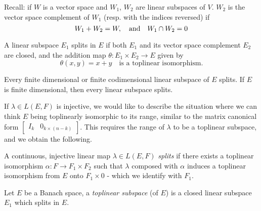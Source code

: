 \documentclass[../main-manifolds.tex]{subfiles}
\begin{document}


Recall: if $W$ is a vector space and $W_1$, $W_2$ are linear subspaces of $V$. $W_2$ is the vector space complement of $W_1$ (resp. with the indices reversed) if 
\[W_1 + W_2 = W,\qqtext{and} W_1\cap W_2 = 0\]
\begin{definition}[Splitting in $E$]\label{def:splitting-subspace}
A linear subspace $E_1$ splits in $E$ if both $E_1$ and its vector space complement $E_2$ are closed, and the addition map $\theta: E_1\times E_2\to E$ given by 
\[
    \theta(x,y)= x + y\quad\text{is a toplinear isomorphism.}
\]
\end{definition}
\begin{remark}
Every finite dimensional or finite codimensional linear subspace of $E$ splits. If $E$ is finite dimensional, then every linear subspace splits.    
\end{remark}
%
%
If $\lambda\in L(E,F)$ is injective, we would like to describe the situation where we can think $E$ being toplinearly isomorphic to its range, similar to the matrix canonical form $\begin{bmatrix}I_{k} & 0_{k\times (n-k)} \end{bmatrix}$. This requires the range of $\lambda$ to be a toplinear subspace, and we obtain the following.
%
\begin{definition}[Splitting in $L(E,F)$]\label{def:splitting-clm}
A continuous, injective linear map $\lambda\in L(E,F)$ \emph{splits} if there exists a toplinear isomorphism $\alpha: F\to F_1\times F_2$ such that $\lambda$ composed with $\alpha$ induces a toplinear isomorphism from $E$ onto $F_1\times 0$ - which we identify with $F_1$.
\end{definition}
%
%
\begin{definition}
    Let $E$ be a Banach space, a \emph{toplinear subspace} (of $E$) is a closed linear subspace $E_1$ which splits in $E$.
\end{definition}
\end{document}

